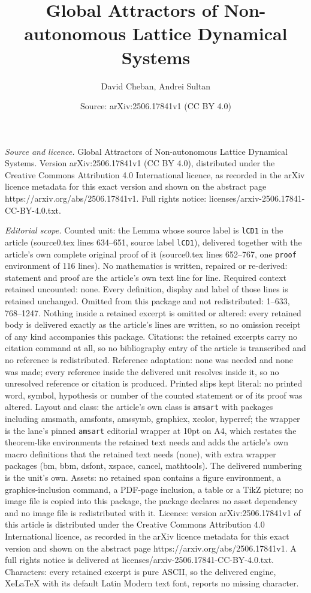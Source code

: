 \documentclass[10pt,a4paper]{amsart}
\title[Global Attractors of Non-autonomous Lattice Dynamical System]{Global Attractors of Non-autonomous Lattice Dynamical Systems}
\author{David Cheban, Andrei Sultan}
\date{Source: arXiv:2506.17841v1 (CC BY 4.0)}
\begin{document}
\maketitle

\noindent\emph{Source and licence.} Global Attractors of Non-autonomous Lattice Dynamical Systems. Version arXiv:2506.17841v1 (CC BY 4.0), distributed under the Creative Commons Attribution 4.0 International licence, as recorded in the arXiv licence metadata for this exact version and shown on the abstract page https://arxiv.org/abs/2506.17841v1. Full rights notice: licenses/arxiv-2506.17841-CC-BY-4.0.txt.\par\smallskip

\noindent\textit{Editorial scope.} Counted unit: the Lemma whose source label is \texttt{lCD1} in the article (source0.tex lines 634--651, source label \texttt{lCD1}), delivered together with the article's own complete original proof of it (source0.tex lines 652--767, one \texttt{proof} environment of 116 lines). No mathematics is written, repaired or re-derived: statement and proof are the article's own text line for line. Required context retained uncounted: none. Every definition, display and label of those lines is retained unchanged. Omitted from this package and not redistributed: 1--633, 768--1247. Nothing inside a retained excerpt is omitted or altered: every retained body is delivered exactly as the article's lines are written, so no omission receipt of any kind accompanies this package. Citations: the retained excerpts carry no citation command at all, so no bibliography entry of the article is transcribed and no reference is redistributed. Reference adaptation: none was needed and none was made; every reference inside the delivered unit resolves inside it, so no unresolved reference or citation is produced. Printed slips kept literal: no printed word, symbol, hypothesis or number of the counted statement or of its proof was altered. Layout and class: the article's own class is \texttt{amsart} with packages including amsmath, amsfonts, amssymb, graphicx, xcolor, hyperref; the wrapper is the lane's pinned \texttt{amsart} editorial wrapper at 10pt on A4, which restates the theorem-like environments the retained text needs and adds the article's own macro definitions that the retained text needs (none), with extra wrapper packages (bm, bbm, dsfont, xspace, cancel, mathtools). The delivered numbering is the unit's own. Assets: no retained span contains a figure environment, a graphics-inclusion command, a PDF-page inclusion, a table or a TikZ picture; no image file is copied into this package, the package declares no asset dependency and no image file is redistributed with it. Licence: version arXiv:2506.17841v1 of this article is distributed under the Creative Commons Attribution 4.0 International licence, as recorded in the arXiv licence metadata for this exact version and shown on the abstract page https://arxiv.org/abs/2506.17841v1. A full rights notice is delivered at licenses/arxiv-2506.17841-CC-BY-4.0.txt. Characters: every retained excerpt is pure ASCII, so the delivered engine, XeLaTeX with its default Latin Modern text font, reports no missing character.
\end{document}
